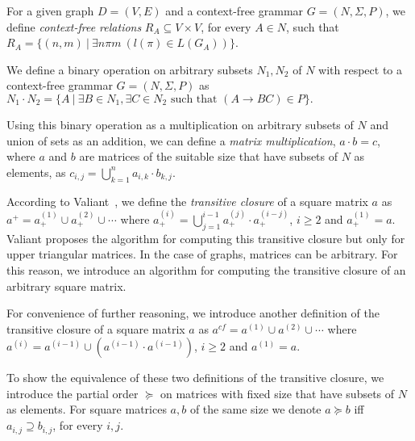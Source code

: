 For a given graph $D = (V, E)$ and a context-free grammar $G = (N, \Sigma, P)$, we define \textit{context-free relations} $R_A \subseteq V \times V$, for every $A \in N$, such that $R_A = \{(n,m)~|~\exists n \pi m~(l(\pi) \in L(G_A))\}$.

We define a binary operation on arbitrary subsets $N_1 , N_2$ of $N$ with respect to a context-free grammar $G = (N, \Sigma, P)$ as $N_1 \cdot N_2 = \{A~|~\exists B \in N_1, \exists C \in N_2 \text{ such that }(A \rightarrow B C) \in P\}.$

Using this binary operation as a multiplication on arbitrary subsets of $N$ and union of sets as an addition, we can define a \textit{matrix multiplication}, $a \cdot b = c$, where $a$ and $b$ are matrices of the suitable size that have subsets of $N$ as elements, as $c_{i,j} = \bigcup^{n}_{k=1}{a_{i,k} \cdot b_{k,j}}$.

According to Valiant~\cite{valiant}, we define the \textit{transitive closure} of a square matrix $a$ as $a^+ = a^{(1)}_+ \cup a^{(2)}_+ \cup \cdots$ where $a^{(i)}_+ = \bigcup^{i-1}_{j=1}{a^{(j)}_+ \cdot a^{(i-j)}_+}$, $i \ge 2$ and $a^{(1)}_+ = a$. Valiant proposes the algorithm for computing this transitive closure but only for upper triangular matrices. In the case of graphs, matrices can be arbitrary. For this reason, we introduce an algorithm for computing the transitive closure of an arbitrary square matrix.

For convenience of further reasoning, we introduce another definition of the transitive closure of a square matrix $a$ as $a^{cf} = a^{(1)} \cup a^{(2)} \cup \cdots$ where $a^{(i)} = a^{(i-1)} \cup (a^{(i-1)} \cdot a^{(i-1)})$, $i \ge 2$ and $a^{(1)} = a$.

To show the equivalence of these two definitions of the transitive closure, we introduce the partial order $\succeq$ on matrices with fixed size that have subsets of $N$ as elements. For square matrices $a, b$ of the same size we denote $a \succeq b$ iff $a_{i,j} \supseteq b_{i,j}$, for every $i, j$.

